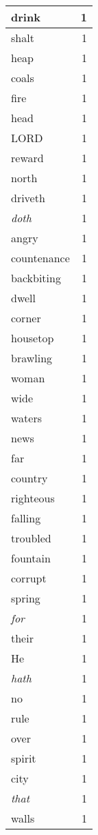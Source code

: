 \begin{center}
\begin{longtable}{l|r}
drink & 1\\ \hline 
shalt & 1\\ \hline 
heap & 1\\ \hline 
coals & 1\\ \hline 
fire & 1\\ \hline 
head & 1\\ \hline 
LORD & 1\\ \hline 
reward & 1\\ \hline 
north & 1\\ \hline 
driveth & 1\\ \hline 
\emph{doth} & 1\\ \hline 
angry & 1\\ \hline 
countenance & 1\\ \hline 
backbiting & 1\\ \hline 
dwell & 1\\ \hline 
corner & 1\\ \hline 
housetop & 1\\ \hline 
brawling & 1\\ \hline 
woman & 1\\ \hline 
wide & 1\\ \hline 
waters & 1\\ \hline 
news & 1\\ \hline 
far & 1\\ \hline 
country & 1\\ \hline 
righteous & 1\\ \hline 
falling & 1\\ \hline 
troubled & 1\\ \hline 
fountain & 1\\ \hline 
corrupt & 1\\ \hline 
spring & 1\\ \hline 
\emph{for} & 1\\ \hline 
their & 1\\ \hline 
He & 1\\ \hline 
\emph{hath} & 1\\ \hline 
no & 1\\ \hline 
rule & 1\\ \hline 
over & 1\\ \hline 
spirit & 1\\ \hline 
city & 1\\ \hline 
\emph{that} & 1\\ \hline 
walls & 1\\ \hline 
\end{longtable}  
\end{center}  


